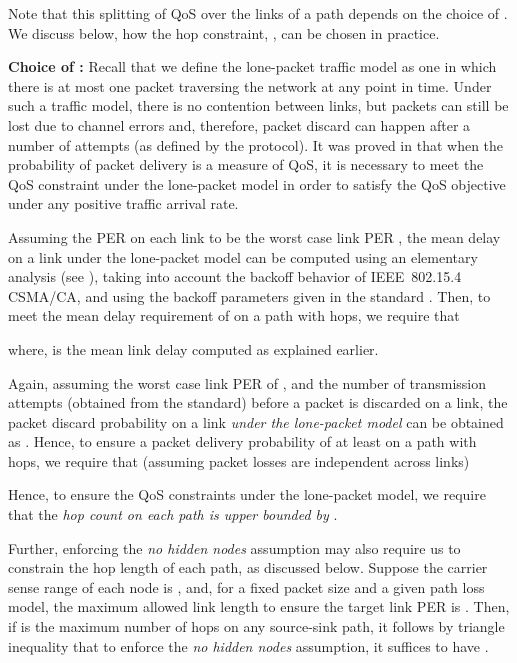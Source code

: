 \documentclass[12pt, draftclsnofoot, onecolumn]{IEEEtran}
\newcommand{\gap}{\vspace{2mm}}
\begin{document}
Note that this splitting of QoS over the links of a path depends on the choice of . We discuss below, how the hop constraint, , can be chosen in practice. 

\gap
\noindent
\textbf{Choice of :} Recall that we define the lone-packet traffic model as one in which there is at most one packet traversing the network at any point in time. Under such a traffic model, there is no contention between links, but packets can still be lost due to channel errors and, therefore, packet discard can happen after a number of attempts (as defined by the protocol). It was proved in \cite{fullpaper} that when the probability of packet delivery is a measure of QoS, it is necessary to meet the QoS constraint under the lone-packet model in order to satisfy the QoS objective under any positive traffic arrival rate. 

Assuming the PER on each link to be the worst case link PER , the mean delay on a link under the lone-packet model can be computed using an elementary analysis (see \cite{abhijitmeth}), taking into account the backoff behavior of IEEE~802.15.4 CSMA/CA, and using the backoff parameters given in the standard \cite{IEEE}. Then, to meet the mean delay requirement of  on a path with  hops, we require that


where,  is the mean link delay computed as explained earlier.

Again, assuming the worst case link PER of , and the number of transmission attempts  (obtained from the standard) before a packet is discarded on a link, the packet discard probability on a link \emph{under the lone-packet model} can be obtained as . Hence, to ensure a packet delivery probability of at least  on a path with  hops, we require that (assuming packet losses are independent across links)



Hence, to ensure the QoS constraints under the lone-packet model, we require that the \emph{hop count on each path is upper bounded by }.

Further, enforcing the \emph{no hidden nodes} assumption may also require us to constrain the hop length of each path, as discussed below. Suppose the carrier sense range of each node is , and, for a fixed packet size and a given path loss model, the maximum allowed link length to ensure the target link PER  is . Then, if  is the maximum number of hops on any source-sink path, it follows by triangle inequality that to enforce the \emph{no hidden nodes} assumption, it suffices to have . 
\end{document}
